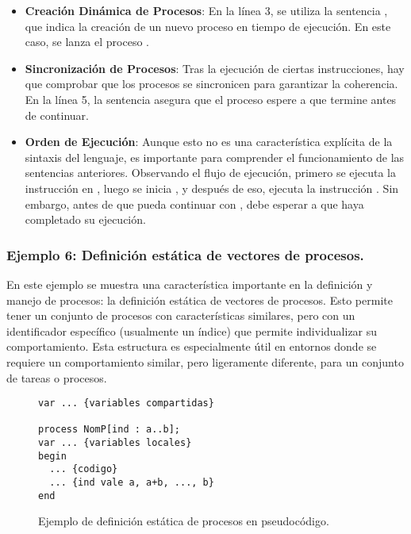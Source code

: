 \begin{itemize}
    \item \textbf{Creación Dinámica de Procesos}: En la línea 3, se utiliza la sentencia , que indica la creación de un nuevo proceso en tiempo de ejecución. En este caso, se lanza el proceso .
    
    \item \textbf{Sincronización de Procesos}: Tras la ejecución de ciertas instrucciones, hay que comprobar que los procesos se sincronicen para garantizar la coherencia. En la línea 5, la sentencia  asegura que el proceso  espere a que  termine antes de continuar.
    
    \item \textbf{Orden de Ejecución}: Aunque esto no es una característica explícita de la sintaxis del lenguaje, es importante para comprender el funcionamiento de las sentencias anteriores. Observando el flujo de ejecución, primero se ejecuta la instrucción  en , luego se inicia , y después de eso,  ejecuta la instrucción . Sin embargo, antes de que  pueda continuar con , debe esperar a que  haya completado su ejecución.
\end{itemize}

\subsubsection{Ejemplo 6: Definición estática de vectores de procesos.}\label{subsubsec:pseudoAnalisisEjemplo6}
En este ejemplo se muestra una característica importante en la definición y manejo de procesos: la definición estática de vectores de procesos. Esto permite tener un conjunto de procesos con características similares, pero con un identificador específico (usualmente un índice) que permite individualizar su comportamiento. Esta estructura es especialmente útil en entornos donde se requiere un comportamiento similar, pero ligeramente diferente, para un conjunto de tareas o procesos.

\begin{figure}[h]
\begin{lstlisting}[style=lamportStyle]
var ... {variables compartidas}

process NomP[ind : a..b];
var ... {variables locales}
begin
  ... {codigo}
  ... {ind vale a, a+b, ..., b}
end
\end{lstlisting}
\caption{Ejemplo de definición estática de procesos en pseudocódigo.}
\label{fig:ejemplo6}
\end{figure}

